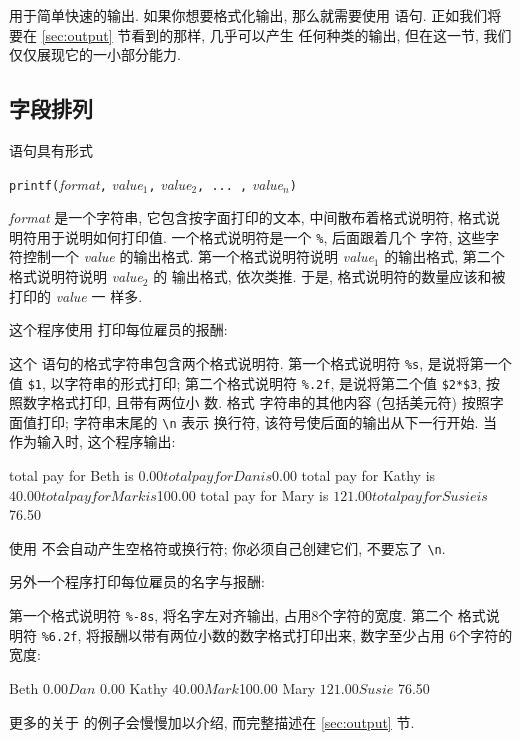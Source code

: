\print 用于简单快速的输出. 如果你想要格式化输出, 那么就需要使用 \printf
语句. 正如我们将要在 \ref{sec:output} 节看到的那样, \printf 几乎可以产生
任何种类的输出, 但在这一节, 我们仅仅展现它的一小部分能力.

\subsection{字段排列}
\label{subsec:lining_up_fields}

\printf 语句具有形式
\begin{pattern}
    \texttt{printf(}\textit{format}\texttt{,} \textit{value$_1$}\texttt{,}
    \textit{value$_2$}\texttt{, ... ,} \textit{value$_n$}\texttt{)}
\end{pattern}
\textit{format} 是一个字符串, 它包含按字面打印的文本, 中间散布着格式说明符,
格式说明符用于说明如何打印值. 一个格式说明符是一个 \verb'%', 后面跟着几个
字符, 这些字符控制一个 \textit{value} 的输出格式. 第一个格式说明符说明
\textit{value$_1$} 的输出格式, 第二个格式说明符说明 \textit{value$_2$} 的
输出格式, 依次类推. 于是, 格式说明符的数量应该和被打印的 \textit{value} 一
样多.

这个程序使用 \printf 打印每位雇员的报酬:
这个 \printf 语句的格式字符串包含两个格式说明符. 第一个格式说明符
\verb'%s', 是说将第一个值 \verb'$1', 以字符串的形式打印; 第二个格式说明符
\verb'%.2f', 是说将第二个值 \verb'$2*$3', 按照数字格式打印, 且带有两位小
数. 格式
字符串的其他内容 (包括美元符) 按照字面值打印; 字符串末尾的 \verb'\n' 表示
换行符, 该符号使后面的输出从下一行开始. 当  作为输入时,
这个程序输出:
\begin{file}
    total pay for Beth is $0.00
    total pay for Dan is $0.00
    total pay for Kathy is $40.00
    total pay for Mark is $100.00
    total pay for Mary is $121.00
    total pay for Susie is $76.50
\end{file}
使用 \printf 不会自动产生空格符或换行符; 你必须自己创建它们, 不要忘了
\verb'\n'.

另外一个程序打印每位雇员的名字与报酬:
第一个格式说明符 \verb'%-8s', 将名字左对齐输出, 占用8个字符的宽度. 第二个
格式说明符 \verb'%6.2f', 将报酬以带有两位小数的数字格式打印出来,
数字至少占用
6个字符的宽度:
\begin{awkcode}
    Beth     $  0.00
    Dan      $  0.00
    Kathy    $ 40.00
    Mark     $100.00
    Mary     $121.00
    Susie    $ 76.50
\end{awkcode}
更多的关于 \printf 的例子会慢慢加以介绍, 而完整描述在
\ref{sec:output} 节.

